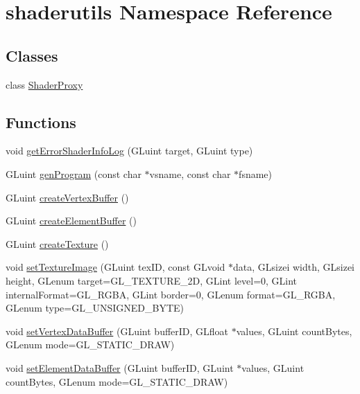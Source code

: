 \hypertarget{namespaceshaderutils}{}\section{shaderutils Namespace Reference}
\label{namespaceshaderutils}
\subsection*{Classes}
\begin{DoxyCompactItemize}
\item 
class \mbox{\hyperlink{classshaderutils_1_1_shader_proxy}{Shader\+Proxy}}
\end{DoxyCompactItemize}
\subsection*{Functions}
\begin{DoxyCompactItemize}
\item 
void \mbox{\hyperlink{namespaceshaderutils_a65da9931b0094fc28feb81c3e561f0f0}{get\+Error\+Shader\+Info\+Log}} (G\+Luint target, G\+Luint type)
\item 
G\+Luint \mbox{\hyperlink{namespaceshaderutils_a30962b257d22ef93daf84638ab350c54}{gen\+Program}} (const char $\ast$vsname, const char $\ast$fsname)
\item 
G\+Luint \mbox{\hyperlink{namespaceshaderutils_a3dd5a3672853d5682b4ed455ec14a8a8}{create\+Vertex\+Buffer}} ()
\item 
G\+Luint \mbox{\hyperlink{namespaceshaderutils_a952f4510fcf359caa18418388d5a3a6b}{create\+Element\+Buffer}} ()
\item 
G\+Luint \mbox{\hyperlink{namespaceshaderutils_aa80123a5faeea08f96535d0072c9fae6}{create\+Texture}} ()
\item 
void \mbox{\hyperlink{namespaceshaderutils_a567a32c32ffab34ac65b9772152fde7a}{set\+Texture\+Image}} (G\+Luint tex\+ID, const G\+Lvoid $\ast$data, G\+Lsizei width, G\+Lsizei height, G\+Lenum target=G\+L\+\_\+\+T\+E\+X\+T\+U\+R\+E\+\_\+2D, G\+Lint level=0, G\+Lint internal\+Format=G\+L\+\_\+\+R\+G\+BA, G\+Lint border=0, G\+Lenum format=G\+L\+\_\+\+R\+G\+BA, G\+Lenum type=G\+L\+\_\+\+U\+N\+S\+I\+G\+N\+E\+D\+\_\+\+B\+Y\+TE)
\item 
void \mbox{\hyperlink{namespaceshaderutils_abb43fbeaf982bca26005030f22b80308}{set\+Vertex\+Data\+Buffer}} (G\+Luint buffer\+ID, G\+Lfloat $\ast$values, G\+Luint count\+Bytes, G\+Lenum mode=G\+L\+\_\+\+S\+T\+A\+T\+I\+C\+\_\+\+D\+R\+AW)
\item 
void \mbox{\hyperlink{namespaceshaderutils_a3f248cb6d3c97c800044f60903334e0e}{set\+Element\+Data\+Buffer}} (G\+Luint buffer\+ID, G\+Luint $\ast$values, G\+Luint count\+Bytes, G\+Lenum mode=G\+L\+\_\+\+S\+T\+A\+T\+I\+C\+\_\+\+D\+R\+AW)
\end{DoxyCompactItemize}


